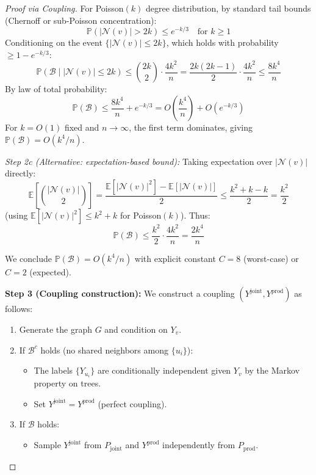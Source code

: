 \begin{proof}[Proof via Coupling]
For Poisson$(k)$ degree distribution, by standard tail bounds (Chernoff or sub-Poisson concentration):
\begin{equation}
    \mathbb{P}(|\mathcal{N}(v)| > 2k) \leq e^{-k/3} \quad \text{for } k \geq 1
\end{equation}
Conditioning on the event $\{|\mathcal{N}(v)| \leq 2k\}$, which holds with probability $\geq 1 - e^{-k/3}$:
\begin{equation}
    \mathbb{P}(\mathcal{B} \mid |\mathcal{N}(v)| \leq 2k) \leq \binom{2k}{2} \cdot \frac{4k^2}{n} = \frac{2k(2k-1)}{2} \cdot \frac{4k^2}{n} \leq \frac{8k^4}{n}
\end{equation}
By law of total probability:
\begin{equation}
    \mathbb{P}(\mathcal{B}) \leq \frac{8k^4}{n} + e^{-k/3} = O\left(\frac{k^4}{n}\right) + O(e^{-k/3})
\end{equation}
For $k = O(1)$ fixed and $n \to \infty$, the first term dominates, giving $\mathbb{P}(\mathcal{B}) = O(k^4/n)$.

\textit{Step 2c (Alternative: expectation-based bound):} Taking expectation over $|\mathcal{N}(v)|$ directly:
\begin{equation}
    \mathbb{E}\left[\binom{|\mathcal{N}(v)|}{2}\right] = \frac{\mathbb{E}[|\mathcal{N}(v)|^2] - \mathbb{E}[|\mathcal{N}(v)|]}{2} \leq \frac{k^2 + k - k}{2} = \frac{k^2}{2}
\end{equation}
(using $\mathbb{E}[|\mathcal{N}(v)|^2] \leq k^2 + k$ for Poisson$(k)$). Thus:
\begin{equation}
    \mathbb{P}(\mathcal{B}) \leq \frac{k^2}{2} \cdot \frac{4k^2}{n} = \frac{2k^4}{n}
\end{equation}

We conclude $\mathbb{P}(\mathcal{B}) = O(k^4/n)$ with explicit constant $C = 8$ (worst-case) or $C = 2$ (expected).

\textbf{Step 3 (Coupling construction):} We construct a coupling $(Y^{\mathrm{joint}}, Y^{\mathrm{prod}})$ as follows:
\begin{enumerate}
    \item Generate the graph $G$ and condition on $Y_v$.
    \item If $\mathcal{B}^c$ holds (no shared neighbors among $\{u_i\}$):
    \begin{itemize}
        \item The labels $\{Y_{u_i}\}$ are conditionally independent given $Y_v$ by the Markov property on trees.
        \item Set $Y^{\mathrm{joint}} = Y^{\mathrm{prod}}$ (perfect coupling).
    \end{itemize}
    \item If $\mathcal{B}$ holds:
    \begin{itemize}
        \item Sample $Y^{\mathrm{joint}}$ from $P_{\mathrm{joint}}$ and $Y^{\mathrm{prod}}$ independently from $P_{\mathrm{prod}}$.
    \end{itemize}
\end{enumerate}


\end{proof}
